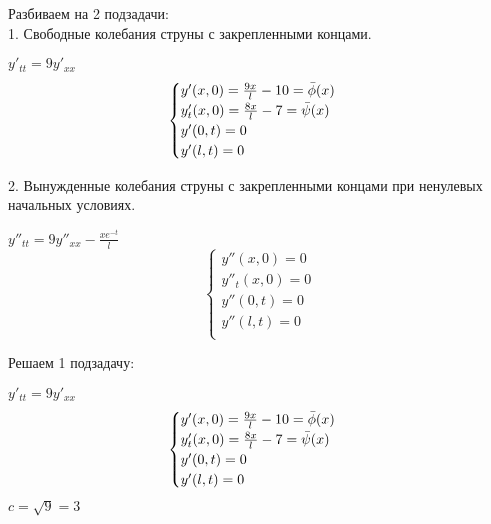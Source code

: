 \documentclass{article}
\begin{document}
    Разбиваем на 2 подзадачи: \\
    1. Свободные колебания струны с закрепленными концами.
    \begin{center}
        $ y'_{tt} = 9y'_{xx} $ \\
        \begin{equation*} 
            \begin{cases}
                y'(x, 0) =  \frac{9x}{l} - 10 = \Bar{\phi}(x) \\
                y'_t(x, 0) = \frac{8x}{l} - 7 = \Bar{\psi}(x) \\
                y'(0, t) = 0 \\
                y'(l, t) = 0 \\
            \end{cases}
		\end{equation*}
    \end{center}
    2. Вынужденные колебания струны с закрепленными концами при ненулевых начальных условиях.
    \begin{center}
        $ y''_{tt} = 9y''_{xx} - \frac{xe^{-t}}{l} $ \\
        \begin{equation*} 
            \begin{cases}
                y''(x, 0) = 0 \\
                y''_t(x, 0) = 0 \\
                y''(0, t) = 0 \\
                y''(l, t) = 0 \\
            \end{cases}
		\end{equation*}
    \end{center}
    Решаем 1 подзадачу: \\
    \begin{center}
        $ y'_{tt} = 9y'_{xx} $ \\
        \begin{equation*} 
            \begin{cases}
                y'(x, 0) =  \frac{9x}{l} - 10 = \Bar{\phi}(x) \\
                y'_t(x, 0) = \frac{8x}{l} - 7 = \Bar{\psi}(x) \\
                y'(0, t) = 0 \\
                y'(l, t) = 0 \\
            \end{cases}
		\end{equation*}
        $ c = \sqrt{9} = 3 $ \\ 
    \end{center}
\end{document}
